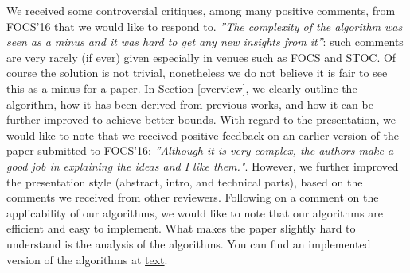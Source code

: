 We received some controversial critiques, among many positive comments, from FOCS'16 that we would like to respond to.
 \textit{''The complexity of the algorithm was seen as a minus and it was hard to get any new insights from it''}: such comments are very rarely (if ever) given especially in venues such as FOCS and STOC. Of course the solution is not trivial, nonetheless we do not believe it is fair to see this as a minus for a paper. In Section \ref{overview}, we clearly outline the algorithm, how it has been derived from previous works, and how it can be further improved to achieve better bounds.
 With regard to the presentation, we would like to note that we received positive feedback on an earlier version of the paper submitted to FOCS'16: \textit{''Although it is very complex, the authors make a good job in explaining the ideas and I like them."}. However, we further improved the presentation style (abstract, intro, and technical parts), based on the comments we received from other reviewers.
 Following on a comment on the applicability of our algorithms, we would like to note that our algorithms are efficient and easy to implement. What makes the paper slightly hard to understand is the analysis of the algorithms. You can find an implemented version of the algorithms at \href{}{text}.

